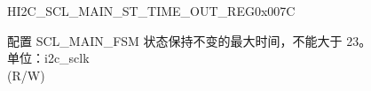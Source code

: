 \begin{register}{H}{I2C\_SCL\_MAIN\_ST\_TIME\_OUT\_REG}{0x007C}\label{regdesc:I2CSCLMAINSTTIMEOUTREG}
%
%
\regnewline%
\begin{regdesc}\begin{reglist}
\label{fielddesc:I2CSCLMAINSTTOI2C}\item [I2C\_SCL\_MAIN\_ST\_TO\_I2C] 配置 SCL\_MAIN\_FSM 状态保持不变的最大时间，不能大于 23。\\
单位：i2c\_sclk \\ (R/W)
\end{reglist}\end{regdesc}
\end{register}


